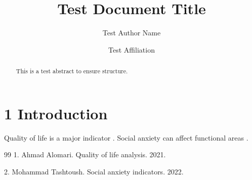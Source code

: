 \documentclass{default}
\begin{document}
\journalheader

\title{Test Document Title}
\author{Test Author Name \and Test Affiliation}
\date{}
\maketitle

\begin{abstract}
This is a test abstract to ensure structure.
\end{abstract}

\section{1 Introduction}

Quality of life is a major indicator \cite{ref1, ref2}. Social anxiety can affect functional areas \cite{ref2}.

\begin{thebibliography}{99}
1. Ahmad Alomari. Quality of life analysis. 2021.

2. Mohammad Tashtoush. Social anxiety indicators. 2022.

\end{thebibliography}
\end{document}
